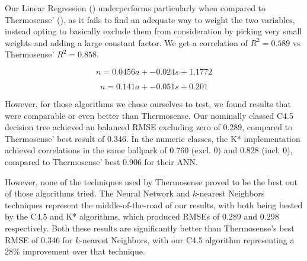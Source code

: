 \documentclass[../thesis/thesis.tex]{subfiles}
\begin{document}
Our Linear Regression () underperforms particularly when compared to Thermosense' (), as it fails to find an adequate way to weight the two variables, instead opting to basically exclude them from consideration by picking very small weights and adding a large constant factor. We get a correlation of $R^2 = 0.589$ vs Thermosense' $R^2 = 0.858$.

\begin{equation} \label{eq:linreg}
n =  0.0456a + -0.024s + 1.1772
\end{equation}

\begin{equation} \label{eq:thermolinreg}
n =  0.141a + -0.051s + 0.201
\end{equation}

However, for those algorithms we chose ourselves to test, we found results that were comparable or even better than Thermosense. Our nominally classed C4.5 decision tree achieved an balanced RMSE excluding zero of 0.289, compared to Thermosense' best result of 0.346. In the numeric classes, the K* implementation achieved correlations in the same ballpark of 0.760 (excl. 0) and 0.828 (incl. 0), compared to Thermosense' best 0.906 for their ANN.

However, none of the techniques used by Thermosense proved to be the best out of those algorithms tried. The Neural Network and $k$-nearest Neighbors techniques represent the middle-of-the-road of our results, with both being bested by the C4.5 and K* algorithms, which produced RMSEs of 0.289 and 0.298 respectively. Both these results are significantly better than Thermosense's best RMSE of 0.346 for $k$-nearest Neighbors, with our C4.5 algorithm representing a 28\% improvement over that technique.


\end{document}

